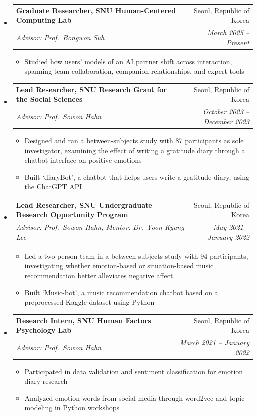 \documentclass[letterpaper,10pt]{article}
\makeatletter
\newcommand{\ENTRYSEP}{0.4em}\newcommand{\PLAINSEP}{0.3em}
\newcommand{\DETSEP}{0.14em}\newcommand{\TOPSEP}{0.35em}
\newcommand{\ENTRYDROP}{-0.15em}
\newcommand{\ENTRYSEP}{0.18em}\newcommand{\PLAINSEP}{0.15em}
\newcommand{\DETSEP}{0.06em}\newcommand{\TOPSEP}{0.18em}
\newcommand{\ENTRYDROP}{-0.35em}
\newcommand{\entry}[4]{%
  \needspace{3.2\baselineskip}\item
  \begin{tabularx}{\linewidth}[t]{@{}>{\raggedright\arraybackslash}X@{\hspace{1.2em}}r@{}}
    \textbf{#1} & #2 \\[0.05em]
    \textit{\small #3} & \textit{\small #4} \\
  \end{tabularx}\vspace{\ENTRYDROP}%
}
\newenvironment{entries}
  {\begin{itemize}[leftmargin=1.2em, itemsep=\ENTRYSEP, parsep=0pt, topsep=\TOPSEP]}
  {\end{itemize}}
\newenvironment{details}
  {\begin{itemize}[label=$\circ$, leftmargin=1.4em, itemsep=\DETSEP, parsep=0pt, topsep=\TOPSEP]}
  {\end{itemize}\vspace{-0.2em}}
\makeatother
\begin{document}
\begin{entries}
  \entry{Graduate Researcher, SNU Human-Centered Computing Lab}{Seoul, Republic of Korea}
        {Advisor: Prof.\ Bongwon Suh}{March 2025 -- Present}
  \begin{details}
    \item Studied how users' models of an AI partner shift across interaction, spanning team
          collaboration, companion relationships, and expert tools
  \end{details}

  \entry{Lead Researcher, SNU Research Grant for the Social Sciences}{Seoul, Republic of Korea}
        {Advisor: Prof.\ Sowon Hahn}{October 2023 -- December 2023}
  \begin{details}
    \item Designed and ran a between-subjects study with 87 participants as sole investigator, examining the effect of writing a gratitude diary through a chatbot interface on positive emotions
    \item Built `diaryBot', a chatbot that helps users write a gratitude diary, using the ChatGPT API
  \end{details}

  \entry{Lead Researcher, SNU Undergraduate Research Opportunity Program}{Seoul, Republic of Korea}
        {Advisor: Prof.\ Sowon Hahn; Mentor: Dr.\ Yoon Kyung Lee}{May 2021 -- January 2022}
  \begin{details}
    \item Led a two-person team in a between-subjects study with 94 participants, investigating whether emotion-based or situation-based music recommendation better alleviates negative affect
    \item Built `Music-bot', a music recommendation chatbot based on a preprocessed Kaggle
          dataset using Python
  \end{details}

  \entry{Research Intern, SNU Human Factors Psychology Lab}{Seoul, Republic of Korea}
        {Advisor: Prof.\ Sowon Hahn}{March 2021 -- January 2022}
  \begin{details}
    \item Participated in data validation and sentiment classification for emotion diary research
    \item Analyzed emotion words from social media through word2vec and topic modeling in
          Python workshops
  \end{details}
\end{entries}
\end{document}
